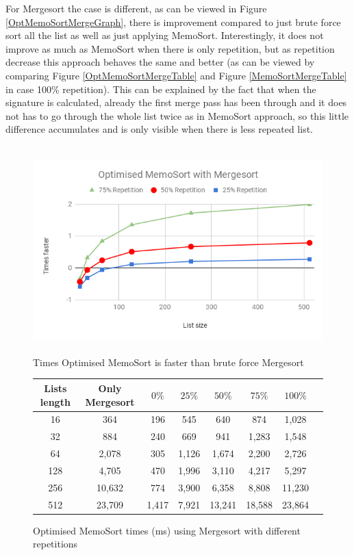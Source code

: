 \documentclass[a4paper,12pt]{article}
\begin{document}
For Mergesort the case is different, as can be viewed in Figure \ref{OptMemoSortMergeGraph}, there is improvement compared to just brute force sort all the list as well as just applying MemoSort. Interestingly, it does not improve as much as MemoSort when there is only repetition, but as repetition decrease this approach behaves the same and better (as can be viewed by comparing Figure \ref{OptMemoSortMergeTable} and Figure \ref{MemoSortMergeTable} in case 100\% repetition). This can be explained by the fact that when the signature is calculated, already the first merge pass has been through and it does not has to go through the whole list twice as in MemoSort approach, so this little difference accumulates and is only visible when there is less repeated list.


\begin{figure}[H]
    \centering
    \includegraphics[height=8cm,keepaspectratio]{./images/OptMemoSortMerge.png}
    \caption{Times Optimised MemoSort is faster than brute force Mergesort}
    \label{fig:OptMemoSortMergeGraph}
\end{figure}


\begin{figure}[H]
\centering
\begin{tabular}{|c|c|c|c|c|c|c|c|}  \toprule
	{Lists length} & {Only Mergesort} & {$0\%$} & {$25\%$} & {$50\%$} & {$75\%$} & {$100\%$} \\ \midrule
	16 &364&196&545 & 640 &874&1,028\\ 
	32 &884&240&669 & 941&1,283&1,548\\ 
	64 &2,078&305 &1,126&1,674&2,200&2,726\\ 
	128 &4,705&470&1,996&3,110&4,217&5,297\\ 
	256 &10,632&774&3,900&6,358&8,808&11,230\\ 
	512 &23,709& 1,417&7,921&13,241&18,588&23,864\\ \bottomrule
\end{tabular}
\caption{Optimised MemoSort times (ms) using Mergesort with different repetitions}
\label{ref:OptMemoSortMergeTable}
\end{figure}
\end{document}
